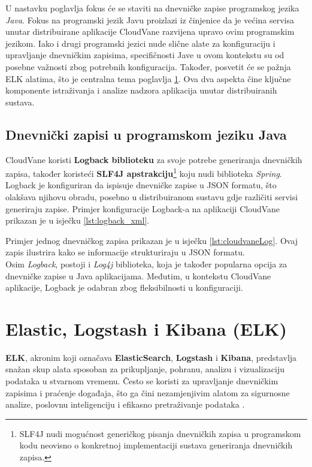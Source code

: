 \documentclass[times, utf8, diplomski]{fer}
\begin{document}
U nastavku poglavlja fokus će se staviti na dnevničke zapise programskog jezika \emph{Java}. Fokus na programski jezik Javu proizlazi iz činjenice da je većina servisa unutar distribuirane aplikacije CloudVane razvijena upravo ovim programskim jezikom. Iako i drugi programski jezici nude slične alate za konfiguraciju i upravljanje dnevničkim zapisima, specifičnosti Jave u ovom kontekstu su od posebne važnosti zbog potrebnih konfiguracija. Također, posvetit će se pažnja ELK alatima, što je centralna tema poglavlja \ref{sec:elk}. Ova dva aspekta čine ključne komponente istraživanja i analize nadzora aplikacija unutar distribuiranih sustava.


\subsection{Dnevnički zapisi u programskom jeziku Java}
\label{sec:java}

CloudVane koristi \textbf{Logback biblioteku} za svoje potrebe generiranja dnevničkih zapisa, također koristeći \textbf{SLF4J apstrakciju}\footnote{SLF4J nudi mogućnost generičkog pisanja dnevničkih zapisa u programskom kodu neovisno o konkretnoj implementaciji sustava generiranja dnevničkih zapisa.} koju nudi biblioteka \emph{Spring}. Logback je konfiguriran da ispisuje dnevničke zapise u JSON formatu, što olakšava njihovu obradu, posebno u distribuiranom sustavu gdje različiti servisi generiraju zapise. Primjer konfiguracije Logback-a na aplikaciji CloudVane prikazan je u isječku \ref{lst:logback_xml}.

Primjer jednog dnevničkog zapisa prikazan je u isječku \ref{lst:cloudvaneLog}. Ovaj zapis ilustrira kako se informacije strukturiraju u JSON formatu.\\

Osim \emph{Logback}, postoji i \emph{Log4j} biblioteka, koja je također popularna opcija za dnevničke zapise u Java aplikacijama. Međutim, u kontekstu CloudVane aplikacije, Logback je odabran zbog fleksibilnosti u konfiguraciji.


\section{Elastic, Logstash i Kibana (ELK)}
\label{sec:elk}

\textbf{ELK}, akronim koji označava \textbf{ElasticSearch}, \textbf{Logstash} i \textbf{Kibana}, predstavlja snažan skup alata sposoban za prikupljanje, pohranu, analizu i vizualizaciju podataka u stvarnom vremenu. Često se koristi za upravljanje dnevničkim zapisima i praćenje događaja, što ga čini nezamjenjivim alatom za sigurnosne analize, poslovnu inteligenciju i efikasno pretraživanje podataka \citep{konda_elasticsearch_2023}.
\end{document}
